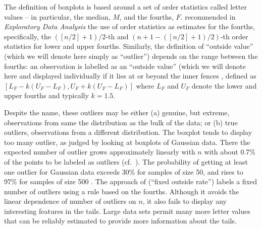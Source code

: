\documentclass[12pt,oneside]{article}
\begin{document}
The definition of boxplots is based around a set of order statistics called letter values -- in particular, the median, $M$, and the fourths, $F$.  
\citet{eda} recommended in \textit{Exploratory Data Analysis} the use of order statistics as estimates for the fourths, specifically, the $([n/2] + 1)/2$-th and $(n + 1 - ([n/2] + 1)/2)$-th order statistics for lower and upper fourths. 
Similarly, the definition of ``outside value'' (which we will denote here
simply as ``outlier'') depends on the range between the fourths: 
%
an observation is labelled as an ``outside value'' (which we will denote here
and displayed individually if it lies at or beyond the
inner fences \citep{eda,emerson83}, defined as $[L_F - k(U_F - L_F), U_F +
k(U_F - L_F)]$ where $L_F$ and $U_F$ denote the lower and upper fourths and
typically $k = 1.5$. 

Despite the name, these outliers may be either (a)
genuine, but extreme, observations from same the distribution as the bulk of
the data; or (b) true outliers, observations from a different distribution.
The boxplot tends to display too many outlier, as judged by looking at
boxplots of Gaussian data. There the expected number of outlier grows
approximately linearly with $n$
with about 0.7\% of the points to be labeled as
outliers (cf.~\citet{dchlv}). The probability of getting at
least one outlier for Gaussian data exceeds 30\% for samples of size 50,
and rises to 97\% for samples of size 500 \citep[pg. 1148]{dchbox}. The approach of \citet{dchbi} (``fixed outside rate'')  labels a fixed
number of outliers  using a rule based
on the fourths. 
Although it avoids the linear dependence of
number of outliers on $n$, it also fails to display any interesting
features in the tails.  Large data sets permit many more letter values
that can be reliably estimated to provide more information about the tails.
\end{document}
